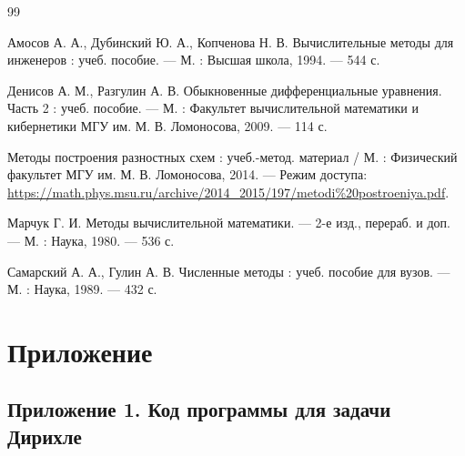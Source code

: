 \documentclass[14pt,a4paper]{extarticle}  %
\numberwithin{equation}{section}
\begin{document}
\begin{thebibliography}{99}

 Амосов А. А., Дубинский Ю. А., Копченова Н. В. Вычислительные методы для инженеров : учеб. пособие. — М. : Высшая школа, 1994. — 544 с.

 Денисов А. М., Разгулин А. В. Обыкновенные дифференциальные уравнения. Часть 2 : учеб. пособие. — М. : Факультет вычислительной математики и кибернетики МГУ им. М. В. Ломоносова, 2009. — 114 с.

 Методы построения разностных схем : учеб.-метод. материал / М. : Физический факультет МГУ им. М. В. Ломоносова, 2014. — Режим доступа: \url{https://math.phys.msu.ru/archive/2014_2015/197/metodi\%20postroeniya.pdf}.

 Марчук Г. И. Методы вычислительной математики. — 2-е изд., перераб. и доп. — М. : Наука, 1980. — 536 с.

 Самарский А. А., Гулин А. В. Численные методы : учеб. пособие для вузов. — М. : Наука, 1989. — 432 с.

\end{thebibliography}

\newpage
\section*{Приложение}
\subsection*{Приложение 1. Код программы для задачи Дирихле}
\label{app:dirichlet}
\end{document}
